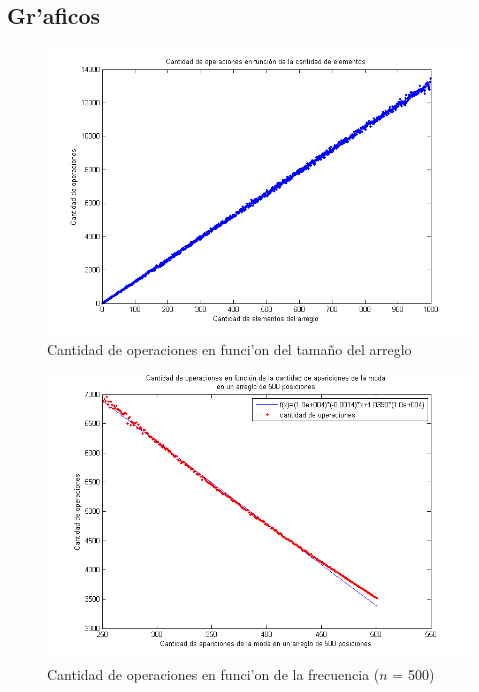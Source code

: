 \subsection{Gr'aficos}

\begin{figure}[H]
\centering
\includegraphics[scale=0.8]{../../codigo/ejercicio3/benchmark/graficos/corridas_aleatorias_n_creciente/grafico.png}
\caption{Cantidad de operaciones en funci'on del tama\~{n}o del arreglo}
\end{figure}

\begin{figure}[H]
\centering
\includegraphics[scale=0.8]{../../codigo/ejercicio3/benchmark/graficos/frecuencia/frecuencia.png}
\caption{Cantidad de operaciones en funci'on de la frecuencia ($n$ = 500)}
\end{figure}

